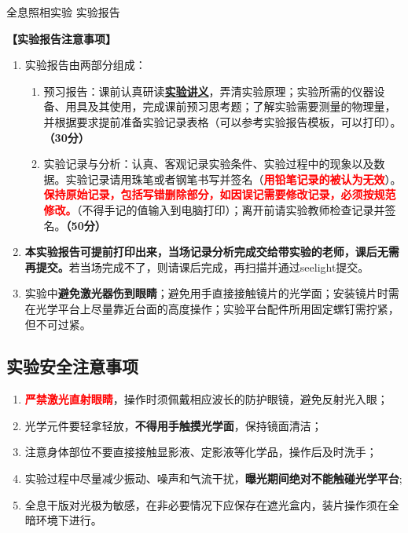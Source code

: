 \documentclass[dvipsnames, svgnames,a4paper,11pt]{article}
\begin{document}

\infoTable{\rule{2.5cm}{0.4pt}}{\rule{2.5cm}{0.4pt}}{\rule{2.5cm}{0.4pt}}{\rule{3cm}{0.4pt}}{\rule{3cm}{0.4pt}}{\rule{3cm}{0.4pt}}

\begin{center}
	\LARGE 全息照相实验 \quad 实验报告
\end{center}

\textbf{【实验报告注意事项】}
\begin{enumerate}
	\item 实验报告由两部分组成：
	\begin{enumerate}
		\item 预习报告：课前认真研读\underline{\textbf{实验讲义}}，弄清实验原理；实验所需的仪器设备、用具及其使用，完成课前预习思考题；了解实验需要测量的物理量，并根据要求提前准备实验记录表格（可以参考实验报告模板，可以打印）。\textbf{（30分）}
	    \item 实验记录与分析：认真、客观记录实验条件、实验过程中的现象以及数据。实验记录请用珠笔或者钢笔书写并签名（\textcolor{red}{\textbf{用铅笔记录的被认为无效}}）。\textcolor{red}{\textbf{保持原始记录，包括写错删除部分，如因误记需要修改记录，必须按规范修改。}}（不得手记的值输入到电脑打印）；离开前请实验教师检查记录并签名。\textbf{（50分）}
	\end{enumerate}
	\item \textbf{本实验报告可提前打印出来，当场记录分析完成交给带实验的老师，课后无需再提交。}若当场完成不了，则请课后完成，再扫描并通过seelight提交。
	\item 实验中\textbf{避免激光器伤到眼睛}；避免用手直接接触镜片的光学面；安装镜片时需在光学平台上尽量靠近台面的高度操作；实验平台配件所用固定螺钉需拧紧，但不可过紧。
\end{enumerate}


\subsection*{实验安全注意事项}
\begin{enumerate}
	\item \textcolor{red}{\textbf{严禁激光直射眼睛}}，操作时须佩戴相应波长的防护眼镜，避免反射光入眼；
	\item 光学元件要轻拿轻放，\textbf{不得用手触摸光学面}，保持镜面清洁；
	\item 注意身体部位不要直接接触显影液、定影液等化学品，操作后及时洗手；
	\item 实验过程中尽量减少振动、噪声和气流干扰，\textbf{曝光期间绝对不能触碰光学平台};
	\item 全息干版对光极为敏感，在非必要情况下应保存在遮光盒内，装片操作须在全暗环境下进行。
\end{enumerate}
\end{document}
